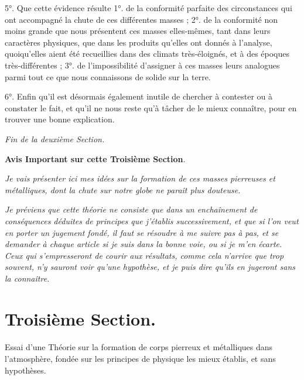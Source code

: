 \documentclass[a4paper, 11pt, oneside, polutonikogreek, french]{article}
\begin{document}
5°. Que cette évidence résulte 1°. de la conformité parfaite des circonstances qui ont accompagné la chute de ces différentes masses ; 2°. de la conformité non moins grande que nous présentent ces masses elles-mêmes, tant dans leurs caractères physiques, que dans les produits qu'elles ont donnés à l'analyse, quoiqu'elles aient été recueillies dans des climats très-éloignés, et à des époques très-différentes ; 3°. de l'impossibilité d'assigner à ces masses leurs analogues parmi tout ce que nous connaissons de solide sur la terre.

6°. Enfin qu'il est désormais également inutile de chercher à contester ou à constater le fait, et qu'il ne nous reste qu'à tâcher de le mieux connaître, pour en trouver une bonne explication.

\begin{center}
\emph{Fin de la deuxième Section.}
\end{center}
\clearpage
\vspace*{\fill}
\begin{center}
\textbf{Avis Important sur cette Troisième Section}.
\end{center}

\emph{Je vais présenter ici mes idées sur la formation de ces masses pierreuses et métalliques, dont la chute sur notre globe ne paraît plus douteuse.}

\emph{Je préviens que cette théorie ne consiste que dans un enchaînement de conséquences déduites de principes que j'établis successivement, et que si l'on veut en porter un jugement fondé, il faut se résoudre à me suivre pas à pas, et se demander à chaque article si je suis dans la bonne voie, ou si je m'en écarte. Ceux qui s'empresseront de courir aux résultats, comme cela n'arrive que trop souvent, n'y sauront voir qu'une hypothèse, et je puis dire qu'ils en jugeront sans la connaître.}
\vspace*{\fill}
\clearpage
\section{Troisième Section.}
\paragraph{}
Essai d'une Théorie sur la formation de corps pierreux et métalliques dans l'atmosphère, fondée sur les principes de physique les mieux établis, et sans hypothèses.
\end{document}
